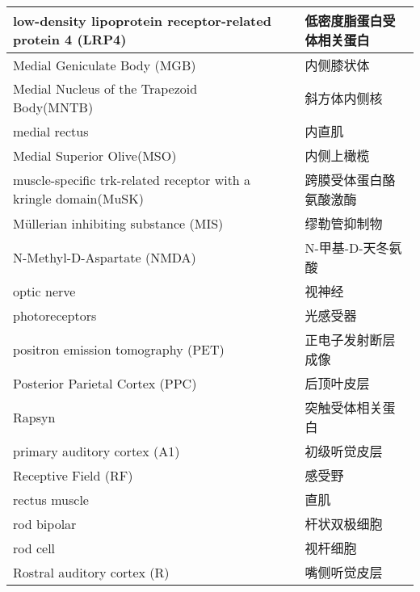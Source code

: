 \begin{longtable}{lll}
	\midrule
	low-density lipoprotein receptor-related protein 4 (LRP4)   && 低密度脂蛋白受体相关蛋白  \\
	
	\midrule
	Medial Geniculate Body (MGB)   && 内侧膝状体  \\
	
	\midrule
	Medial Nucleus of the Trapezoid Body(MNTB)   && 斜方体内侧核  \\
	
	\midrule
	medial rectus    && 内直肌  \\
	
	\midrule
	Medial Superior 		Olive(MSO)   && 内侧上橄榄  \\
	
	\midrule
	muscle-specific trk-related receptor with a
	kringle domain(MuSK)   && 跨膜受体蛋白酪氨酸激酶  \\
	
	\midrule
	Müllerian inhibiting substance (MIS)   && 缪勒管抑制物  \\
	
	\midrule
	N-Methyl-D-Aspartate (NMDA)   && N-甲基-D-天冬氨酸  \\
	
	\midrule
	optic nerve     && 视神经   \\
	
	\midrule
	photoreceptors     && 光感受器   \\
	
	\midrule
	positron emission tomography (PET)     && 正电子发射断层成像   \\
	
	\midrule
	Posterior Parietal Cortex (PPC)     && 后顶叶皮层   \\
	
	\midrule
	Rapsyn   && 突触受体相关蛋白  \\
	
	\midrule
	primary auditory cortex (A1)   && 初级听觉皮层  \\
	
	\midrule
	Receptive Field (RF)   && 感受野  \\
	
	\midrule
	rectus muscle   && 直肌  \\
	
	\midrule
	rod bipolar   && 杆状双极细胞  \\
	
	\midrule
	rod cell   && 视杆细胞  \\
	
	\midrule
	Rostral auditory cortex (R)   && 嘴侧听觉皮层  \\
	

\end{longtable}
